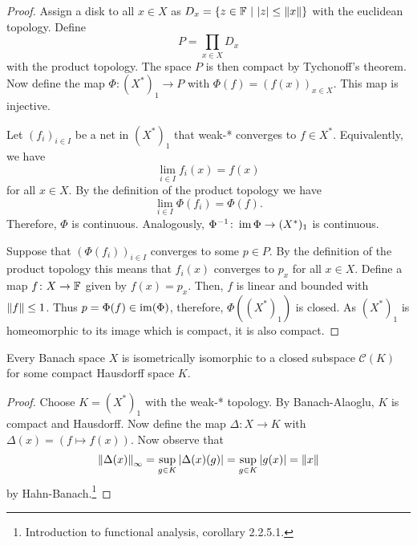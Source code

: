 \begin{proof}
Assign a disk to all $x \in X$ as
$D_x = \left\{z \in \mathbb{F}~\middle\vert~\left\lvert z\right\rvert \leq \left\lVert x\right\rVert\right\}$ with the euclidean
topology. Define
\[
P = \prod_{x \in X} D_x
\]
with the product topology. The space $P$ is then compact by
Tychonoff's theorem. Now define the map $\Phi \colon (X^*)_1 \to P$
with $\Phi(f) = (f(x))_{x \in X}$. This map is injective.

Let $(f_i)_{i \in I}$ be a net in $(X^*)_1$ that weak-* converges
to $f \in X^*$. Equivalently, we have
\[
\lim_{i \in I} f_i(x) = f(x)
\]
for all $x \in X$. By the definition of the product topology we
have
\[
\lim_{i \in I} \Phi(f_i) = \Phi(f).
\]
Therefore, $\Phi$ is continuous. Analogously,
$\Phi^{-1} \colon \operatorname{im} \Phi \to (X^*)_1$ is continuous.

Suppose that $(\Phi(f_i))_{i \in I}$ converges to some $p \in P$.
By the definition of the product topology this means that
$f_i(x)$ converges to $p_x$ for all $x \in X$. Define a map
$f \colon X \to \mathbb{F}$ given by $f(x) = p_x$. Then, $f$ is linear and
bounded with $\left\lVert f\right\rVert \leq 1$. Thus $p = \Phi(f) \in \operatorname{im}(\Phi)$,
therefore, $\Phi((X^*)_1)$ is closed. As $(X^*)_1$ is homeomorphic
to its image which is compact, it is also compact.
\end{proof}

\begin{posledica}
Every Banach space $X$ is isometrically isomorphic to a closed
subspace $\mathcal{C}(K)$ for some compact Hausdorff space $K$.
\end{posledica}

\begin{proof}
Choose $K = (X^*)_1$ with the weak-* topology. By Banach-Alaoglu,
$K$ is compact and Hausdorff. Now define the map
$\Delta \colon X \to K$ with $\Delta(x) = (f \mapsto f(x))$.
Now observe that
\[
\left\lVert \Delta(x)\right\rVert_\infty =
\sup_{g \in K} \left\lvert \Delta(x)(g)\right\rvert =
\sup_{g \in K} \left\lvert g(x)\right\rvert =
\left\lVert x\right\rVert
\]
by Hahn-Banach.\footnote{Introduction to functional analysis,
corollary 2.2.5.1.}
\end{proof}

